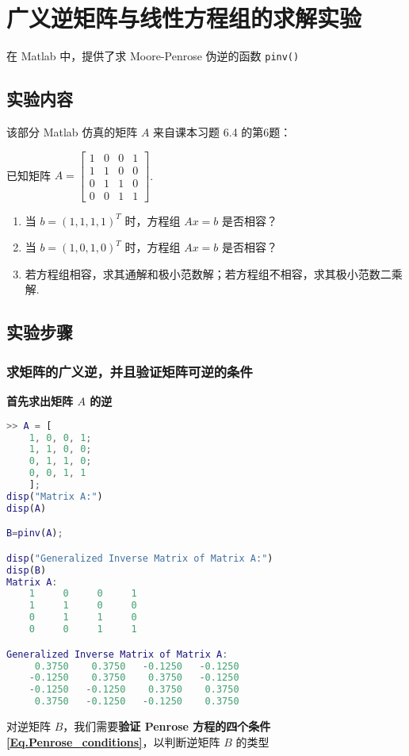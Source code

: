 \chapter{广义逆矩阵与线性方程组的求解实验}
在 Matlab 中，提供了求 Moore-Penrose 伪逆的函数 \lstinline|pinv()| 

\section{实验内容}
该部分 Matlab 仿真的矩阵 $A$ 来自课本习题 6.4 的第6题：

已知矩阵 $A=\begin{bmatrix}
    1 & 0 & 0 & 1 \\
    1 & 1 & 0 & 0 \\
    0 & 1 & 1 & 0 \\
    0 & 0 & 1 & 1
\end{bmatrix}$.
\begin{enumerate}
    \item 当 $b=(1,1,1,1)^T$ 时，方程组 $Ax=b$ 是否相容？
    \item 当 $b=(1,0,1,0)^T$ 时，方程组 $Ax=b$ 是否相容？
    \item 若方程组相容，求其通解和极小范数解；若方程组不相容，求其极小范数二乘解.
\end{enumerate}

\section{实验步骤}
\subsection{求矩阵的广义逆，并且验证矩阵可逆的条件}
\textbf{首先求出矩阵 $A$ 的逆}
\begin{lstlisting}[language=Matlab]  
>> A = [
    1, 0, 0, 1;
    1, 1, 0, 0;
    0, 1, 1, 0;
    0, 0, 1, 1
    ];
disp("Matrix A:")
disp(A)

B=pinv(A);

disp("Generalized Inverse Matrix of Matrix A:")
disp(B)
Matrix A:
    1     0     0     1
    1     1     0     0
    0     1     1     0
    0     0     1     1

Generalized Inverse Matrix of Matrix A:
     0.3750    0.3750   -0.1250   -0.1250
    -0.1250    0.3750    0.3750   -0.1250
    -0.1250   -0.1250    0.3750    0.3750
     0.3750   -0.1250   -0.1250    0.3750
\end{lstlisting}

对逆矩阵 $B$，我们需要\textbf{验证 Penrose 方程的四个条件\ref{Eq.Penrose_conditions}}，以判断逆矩阵 $B$ 的类型

